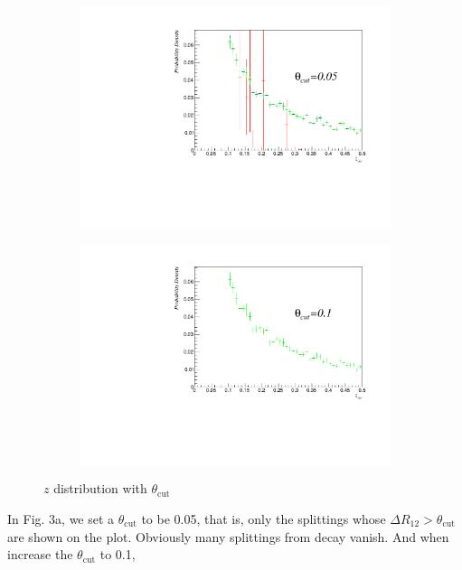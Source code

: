 \documentclass[a4paper, 12pt]{article}
\begin{document}
		\begin{figure}[t]
			\centering
			\begin{subfigure}{0.47\linewidth}
				\centering
				\includegraphics[width=\linewidth]{2.pdf}
				\caption{}
			\end{subfigure}
			\begin{subfigure}{0.47\textwidth}
				\centering
				\includegraphics[width=\linewidth]{3.pdf}
				\caption{}
			\end{subfigure}
			\caption{$z$ distribution with $\theta_{\mathrm{cut}}$}
		\end{figure}
		In Fig. 3a, we set a $\theta_{\mathrm{cut}}$ to be 0.05, that is, only the splittings whose $\Delta R_{12}>\theta_{\mathrm{cut}}$
		are shown on the plot. Obviously many splittings from decay vanish. And when increase the $\theta_{\mathrm{cut}}$ to 0.1,
\end{document}
